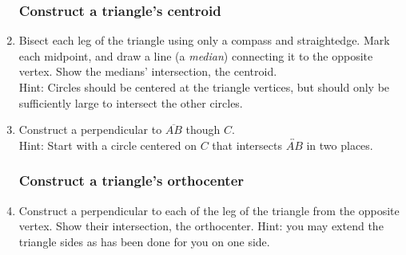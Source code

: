 \begin{enumerate}
\subsubsection*{Construct a triangle's centroid}
\item Bisect each leg of the triangle using only a compass and straightedge. Mark each midpoint, and draw a line (a \emph{median}) connecting it to the opposite vertex. Show the medians' intersection, the centroid.\\[0.2cm]
Hint: Circles should be centered at the triangle vertices, but should only be sufficiently large to intersect the other circles.
    \vspace{3cm}
    \begin{center}
    \end{center}


\item Construct a perpendicular to $\overline{AB}$ though $C$.\\
  Hint: Start with a circle centered on $C$ that intersects $\overleftrightarrow{AB}$ in two places.
    \vspace{2cm}
    \begin{center}
  \end{center} \vspace{2cm}

\subsubsection*{Construct a triangle's orthocenter}
\item Construct a perpendicular to each of the leg of the triangle from the opposite vertex. Show their intersection, the orthocenter. Hint: you may extend the triangle sides as has been done for you on one side.%
    \vspace{3cm}
    \begin{center}
\end{center}
\end{enumerate}
